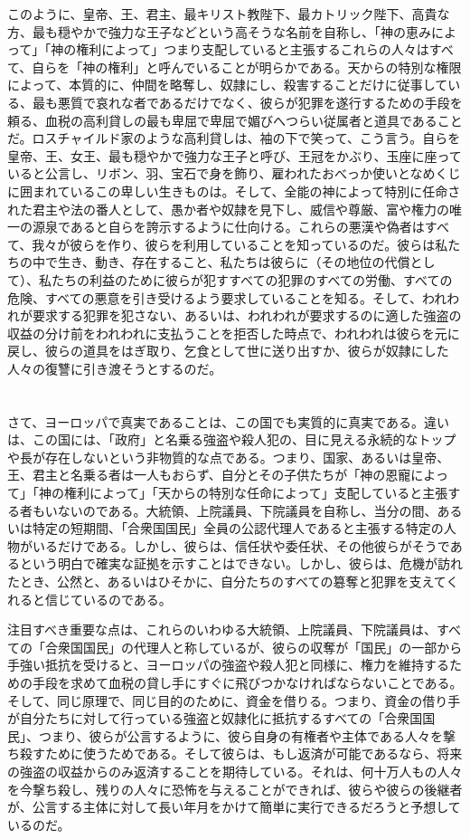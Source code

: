 \documentclass[dvipdfmx, uplatex, tate, landscape]{utbook}
\begin{document}
このように、皇帝、王、君主、最キリスト教陛下、最カトリック陛下、高貴な方、最も穏やかで強力な王子などという高そうな名前を自称し、「神の恵みによって」「神の権利によって」つまり支配していると主張するこれらの人々はすべて、自らを「神の権利」と呼んでいることが明らかである。天からの特別な権限によって、本質的に、仲間を略奪し、奴隷にし、殺害することだけに従事している、最も悪質で哀れな者であるだけでなく、彼らが犯罪を遂行するための手段を頼る、血税の高利貸しの最も卑屈で卑屈で媚びへつらい従属者と道具であることだ。ロスチャイルド家のような高利貸しは、袖の下で笑って、こう言う。自らを皇帝、王、女王、最も穏やかで強力な王子と呼び、王冠をかぶり、玉座に座っていると公言し、リボン、羽、宝石で身を飾り、雇われたおべっか使いとなめくじに囲まれているこの卑しい生きものは。そして、全能の神によって特別に任命された君主や法の番人として、愚か者や奴隷を見下し、威信や尊厳、富や権力の唯一の源泉であると自らを誇示するように仕向ける。これらの悪漢や偽者はすべて、我々が彼らを作り、彼らを利用していることを知っているのだ。彼らは私たちの中で生き、動き、存在すること、私たちは彼らに（その地位の代償として）、私たちの利益のために彼らが犯すすべての犯罪のすべての労働、すべての危険、すべての悪意を引き受けるよう要求していることを知る。そして、われわれが要求する犯罪を犯さない、あるいは、われわれが要求するのに適した強盗の収益の分け前をわれわれに支払うことを拒否した時点で、われわれは彼らを元に戻し、彼らの道具をはぎ取り、乞食として世に送り出すか、彼らが奴隷にした人々の復讐に引き渡そうとするのだ。

\chapter{}

さて、ヨーロッパで真実であることは、この国でも実質的に真実である。違いは、この国には、「政府」と名乗る強盗や殺人犯の、目に見える永続的なトップや長が存在しないという非物質的な点である。つまり、国家、あるいは皇帝、王、君主と名乗る者は一人もおらず、自分とその子供たちが「神の恩寵によって」「神の権利によって」「天からの特別な任命によって」支配していると主張する者もいないのである。大統領、上院議員、下院議員を自称し、当分の間、あるいは特定の短期間、「合衆国国民」全員の公認代理人であると主張する特定の人物がいるだけである。しかし、彼らは、信任状や委任状、その他彼らがそうであるという明白で確実な証拠を示すことはできない。しかし、彼らは、危機が訪れたとき、公然と、あるいはひそかに、自分たちのすべての簒奪と犯罪を支えてくれると信じているのである。

注目すべき重要な点は、これらのいわゆる大統領、上院議員、下院議員は、すべての「合衆国国民」の代理人と称しているが、彼らの収奪が「国民」の一部から手強い抵抗を受けると、ヨーロッパの強盗や殺人犯と同様に、権力を維持するための手段を求めて血税の貸し手にすぐに飛びつかなければならないことである。そして、同じ原理で、同じ目的のために、資金を借りる。つまり、資金の借り手が自分たちに対して行っている強盗と奴隷化に抵抗するすべての「合衆国国民」、つまり、彼らが公言するように、彼ら自身の有権者や主体である人々を撃ち殺すために使うためである。そして彼らは、もし返済が可能であるなら、将来の強盗の収益からのみ返済することを期待している。それは、何十万人もの人々を今撃ち殺し、残りの人々に恐怖を与えることができれば、彼らや彼らの後継者が、公言する主体に対して長い年月をかけて簡単に実行できるだろうと予想しているのだ。
\end{document}
